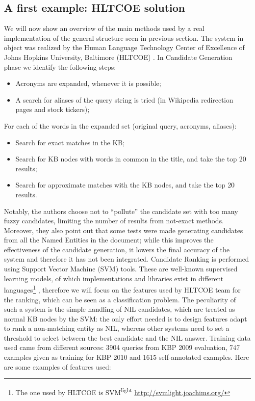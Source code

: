 \documentclass[a4paper,11pt]{report}
\begin{document}
\subsection{A first example: HLTCOE solution}
\label{sec:hltcoe}
We will now show an overview of the main methods used by a real implementation of the general structure seen in previous section. The system in object was realized by the Human Language Technology Center of Excellence of Johns Hopkins University, Baltimore (HLTCOE) \cite{2010hltcoe}.
In Candidate Generation phase we identify the following steps:
\begin{itemize}
\item Acronyms are expanded, whenever it is possible;
\item A search for aliases of the query string is tried (in Wikipedia redirection pages and stock tickers);
\end{itemize}
For each of the words in the expanded set (original query, acronyms, aliases):
\begin{itemize}
\item Search for exact matches in the KB;
\item Search for KB nodes with words in common in the title, and take the top 20 results;
\item Search for approximate matches with the KB nodes, and take the top 20 results.
\end{itemize}
Notably, the authors choose not to ``pollute'' the candidate set with too many fuzzy candidates, limiting the number of results from not-exact methods. Moreover, they also point out that some tests were made generating candidates from all the Named Entities in the document; while this improves the effectiveness of the candidate generation, it lowers the final accuracy of the system and therefore it has not been integrated.
Candidate Ranking is performed using Support Vector Machine (SVM) tools. These are well-known supervised learning models, of which implementations and libraries exist in different languages\footnote{The one used by HLTCOE is SVM\textsuperscript{light} \url{http://svmlight.joachims.org/}}
, therefore we will focus on the features used by HLTCOE team for the ranking, which can be seen as a classification problem. The peculiarity of such a system is the simple handling of NIL candidates, which are treated as normal KB nodes by the SVM: the only effort needed is to design features adapt to rank a non-matching entity as NIL, whereas other systems need to set a threshold to select between the best candidate and the NIL answer.
Training data used came from different sources: 3904 queries from KBP 2009 evaluation, 747 examples given as training for KBP 2010 and 1615 self-annotated examples.
Here are some examples of features used:
\end{document}
